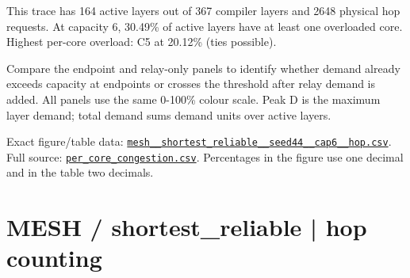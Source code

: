 \documentclass[10pt,a4paper]{article}
\begin{document}
This trace has 164 active layers out of 367 compiler layers and 2648 physical hop requests. At capacity 6, 30.49\% of active layers have at least one overloaded core. Highest per-core overload: C5 at 20.12\% (ties possible).\par
Compare the endpoint and relay-only panels to identify whether demand already exceeds capacity at endpoints or crosses the threshold after relay demand is added. All panels use the same 0-100\% colour scale. Peak D is the maximum layer demand; total demand sums demand units over active layers.\par
Exact figure/table data: \href{\detokenize{file:///home/dhruv-pansuriya/Documents/BTP/Compiler-Driven-ACE/output/pdf/qaoa_methods_congestion/tables/mesh__shortest_reliable__seed44__cap6__hop.csv}}{\nolinkurl{mesh__shortest_reliable__seed44__cap6__hop.csv}}. Full source: \href{\detokenize{file:///home/dhruv-pansuriya/Documents/BTP/Compiler-Driven-ACE/results/qaoa_2seed_2026-10-26/congestion/per_core_congestion.csv}}{\nolinkurl{per_core_congestion.csv}}. Percentages in the figure use one decimal and in the table two decimals.\par
\clearpage
\section*{MESH / shortest\_reliable | hop counting}
\end{document}
